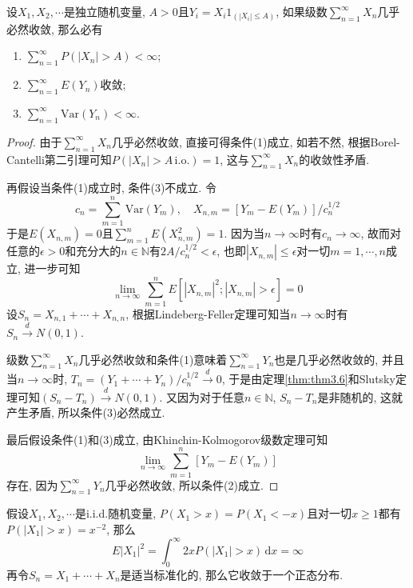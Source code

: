 \documentclass[cn, 12pt, math=mtpro2, bibstyle=apa, blue, twocol]{elegantbook}
\newcommand{\limn}{\lim_{n\to\infty}}
\begin{document}
\begin{example}[$\,$Kolmogorov三级数定理的必要条件]
 设$X_1,X_2,\cdots$是独立随机变量, $A>0$且$Y_i=X_i1_{(|X_i|\leq A)}$, 如果级数$\sum_{n=1}^{\infty}X_n$几乎必然收敛, 那么必有
  \begin{enumerate}[label=(\arabic*)]
    \item $\sum_{n=1}^{\infty}P(|X_n|>A)<\infty$;
    \item $\sum_{n=1}^{\infty}E(Y_n)$收敛;
    \item $\sum_{n=1}^{\infty}\text{Var}(Y_n)<\infty$.
  \end{enumerate}
\end{example}
\begin{proof}
  由于$\sum_{n=1}^{\infty}X_n$几乎必然收敛, 直接可得条件(1)成立, 如若不然, 根据Borel-Cantelli第二引理可知$P(|X_n|>A\,\text{i.o.})=1$, 这与$\sum_{n=1}^{\infty}X_n$的收敛性矛盾.

  再假设当条件(1)成立时, 条件(3)不成立. 令
  $$c_n=\sum_{m=1}^{n}\text{Var}(Y_m),\quad X_{n,m}=[Y_m-E(Y_m)]/c_n^{1/2}$$
  于是$E(X_{n,m})=0$且$\sum_{m=1}^{n}E(X_{n,m}^2)=1$. 因为当$n\to\infty$时有$c_n\to\infty$, 故而对任意的$\epsilon>0$和充分大的$n\in\mathbb{N}$有$2A/c_n^{1/2}<\epsilon$, 也即$|X_{n,m}|\leq\epsilon$对一切$m=1,\cdots,n$成立, 进一步可知
  $$\limn \sum_{m=1}^{n}E[|X_{n,m}|^2;|X_{n,m}|>\epsilon]=0$$
  设$S_n=X_{n,1}+\cdots+X_{n,n}$, 根据Lindeberg-Feller定理可知当$n\to\infty$时有
  $S_n\xrightarrow{d}N(0,1)$.

  级数$\sum_{n=1}^{\infty}X_n$几乎必然收敛和条件(1)意味着$\sum_{n=1}^{\infty}Y_n$也是几乎必然收敛的, 并且当$n\to\infty$时, $T_n=(Y_1+\cdots+Y_n)/c_n^{1/2}\xrightarrow{d} 0$, 于是由定理\ref{thm:thm3.6}和Slutsky定理可知$(S_n-T_n)\xrightarrow{d} N(0,1)$. 又因为对于任意$n\in\mathbb{N}$, $S_n-T_n$是非随机的, 这就产生矛盾, 所以条件(3)必然成立.

  最后假设条件(1)和(3)成立, 由Khinchin-Kolmogorov级数定理可知$$\limn \sum_{m=1}^{n}[Y_m-E(Y_m)]$$存在, 因为$\sum_{n=1}^{\infty}Y_n$几乎必然收敛, 所以条件(2)成立.
\end{proof}
\begin{example}[无限方差]
假设$X_1,X_2,\cdots$是i.i.d.随机变量, $P(X_1>x)=P(X_1<-x)$且对一切$x\ge1$都有$P(|X_1|>x)=x^{-2}$, 那么
$$E|X_1|^2=\int_{0}^{\infty}2xP(|X_1|>x)\,\text{d}x=\infty$$
再令$S_n=X_1+\cdots+X_n$是适当标准化的, 那么它收敛于一个正态分布.
\end{example}
\end{document}
